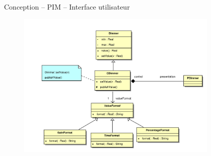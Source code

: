 \documentclass[frenchb]{beamer}
\begin{document}
\begin{frame}{Conception -- PIM -- Interface utilisateur}
    \begin{figure}
        \includegraphics[height=7cm]{../img/ps/pacdimmer-pim.pdf}
    \end{figure}
\end{frame}
\end{document}

